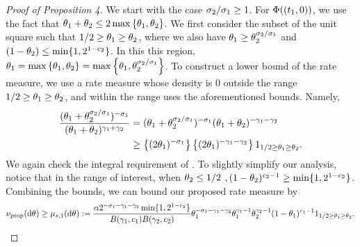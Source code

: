 \begin{proof}[Proof of Proposition 4]
We start with the case $\sigma_{2}/\sigma_{1}\ge 1$. For $\Phi((t_1,0))$, we use the fact that $\theta_{1}+\theta_{2}\le 2\max\left\{\theta_{1}, \theta_{2}\right\}$. We first consider the subset of the unit square such that $1/2 \ge \theta_{1}\ge \theta_{2}$, where we also have $\theta_{1}\ge \theta_{2}^{\sigma_{2}/\sigma_{1}}$ and $(1-\theta_{2})\le \min\{1, 2^{1-c_{2}}\}$. In this this region, $\theta_{1}=\max\left\{\theta_{1},\theta_{2}\right\}=\max\left\{\theta_{1}, \theta_{2}^{\sigma_{2}/\sigma_{1}}\right\}$. To construct a lower bound of the rate measure, we use a rate measure whose density is 0 outside the range $1/2 \ge \theta_{1}\ge \theta_{2}$, and within the range uses  the aforementioned bounds. Namely, 
\begin{align*}
        \frac{(\variantfreqperpop{1}+\variantfreqperpop{2}^{\rate{2}/\rate{1}})^{-\rate{1}}}{(\variantfreqperpop{1}+\variantfreqperpop{2})^{\corr{1}+\corr{2}}}&=(\variantfreqperpop{1}+\variantfreqperpop{2}^{\rate{2}/\rate{1}})^{-\rate{1}}(\variantfreqperpop{1}+\variantfreqperpop{2})^{-\corr{1}-\corr{2}}\\
        &\ge \left\{(2\variantfreqperpop{1})^{-\rate{1}} \right\} \left\{ (2\variantfreqperpop{1})^{-\corr{1}-\corr{2}} \right\}\bm{1}_{1/2 \ge \variantfreqperpop{1}\ge \variantfreqperpop{2}}.
\end{align*}
We again check the integral requirement of .
To slightly simplify our analysis, notice that in the range of interest, when $\theta_{2}\le 1/2$ $,(1-\theta_{2})^{c_{2}-1}\ge \min\{1, 2^{1-c_{2}}\}$. Combining the bounds, we can bound our proposed rate measure by 
\begin{align*}
    \ratemeasproposed(\de\vecvariantfreq{})\ge\mu_{s,1}(\de\vecvariantfreq{}):= \frac{\mass 2^{-\rate{1}-\corr{1}-\corr{2}}\min\{1, 2^{1-\conc{2}}\}}{B(\corr{1}, \conc{1})B(\corr{2}, \conc{2})}\variantfreqperpop{1}^{-\rate{1}-\corr{1}-\corr{2}} \variantfreqperpop{1}^{\corr{1}-1}\variantfreqperpop{2}^{\corr{2}-1}(1-\variantfreqperpop{1})^{\conc{1}-1} \bm{1}_{1/2 \ge \variantfreqperpop{1}\ge \variantfreqperpop{2}}.
\end{align*}


\end{proof}
